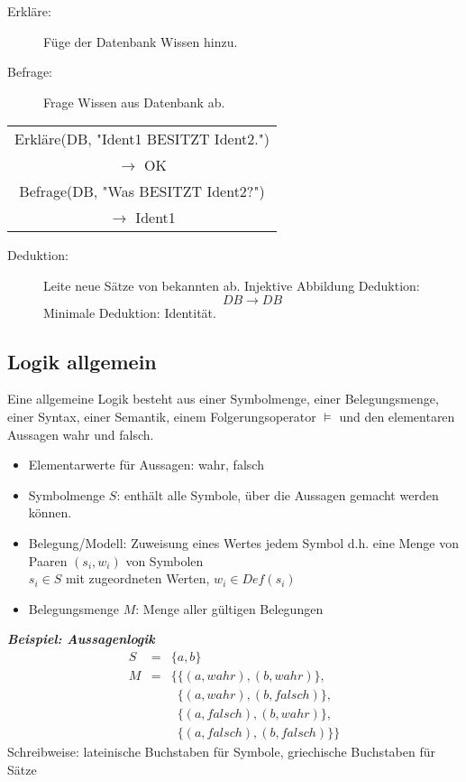 
\begin{description}
\item[Erkläre:] Füge der Datenbank Wissen hinzu.
\item[Befrage:] Frage Wissen aus Datenbank ab.
\end{description}
\begin{center}
\begin{tabular}{|c|}
\hline
Erkläre(DB, "{}Ident1 BESITZT Ident2."{}) \\ $\to$ OK \\ Befrage(DB, "{}Was BESITZT Ident2?"{}) \\ $\to$ Ident1 \\ \hline
\end{tabular}
\end{center}


\begin{description}
\item[Deduktion:] Leite neue Sätze von bekannten ab. Injektive Abbildung Deduktion: $$DB \to DB$$ Minimale Deduktion: Identität.
\end{description}

\subsection{Logik allgemein}

Eine allgemeine Logik besteht aus einer Symbolmenge, einer Belegungsmenge, einer Syntax, einer Semantik, einem Folgerungsoperator $\models$ und den elementaren Aussagen wahr und falsch.

\begin{itemize}
\item Elementarwerte für Aussagen: wahr, falsch
\item Symbolmenge $S$: enthält alle Symbole, über die Aussagen gemacht werden können.
\item Belegung/Modell: Zuweisung eines Wertes jedem Symbol d.h. eine Menge von Paaren $(s_i,w_i)$ von Symbolen \\ $s_i \in S$ mit zugeordneten Werten, $w_i \in Def(s_i)$
\item Belegungsmenge $M$: Menge aller gültigen Belegungen
\end{itemize}

\textbf{\textsl{Beispiel: Aussagenlogik}}
\begin{eqnarray*}
S &=& \{a,b\} \\ M &=& \{ \{ (a,wahr),(b,wahr) \} , \\ && \,\,\, \{ (a,wahr),(b,falsch)\} , \\ && \,\,\, \{ (a,falsch),(b,wahr) \} , \\ && \,\,\, \{ (a,falsch) , (b,falsch) \} \}
\end{eqnarray*}
Schreibweise: lateinische Buchstaben für Symbole, griechische Buchstaben für Sätze

